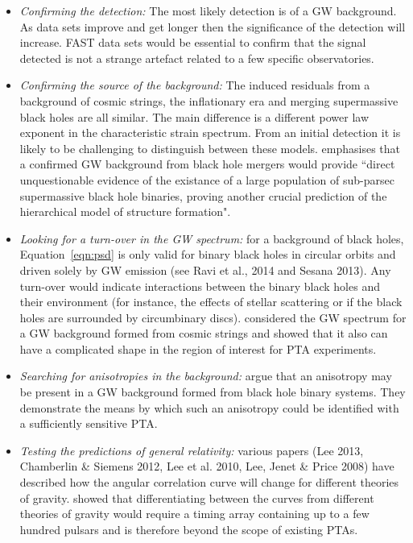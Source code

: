 \documentclass{raa}            %
\begin{document}
\begin{itemize}
\item \emph{Confirming the detection:}  The most likely detection is of a GW background.  As data sets improve and get longer then the significance of the detection will increase.  FAST data sets would be essential to confirm that the signal detected is not a strange artefact related to a few specific observatories.
\item \emph{Confirming the source of the background:} The induced residuals from a background of cosmic strings, the inflationary era and merging supermassive black holes are all similar. The main difference is a different power law exponent in the characteristic strain spectrum.  From an initial detection it is likely to be challenging to distinguish between these models.  \cite{ses13} emphasises that a confirmed GW background from black hole mergers would provide ``direct unquestionable evidence of the existance of a large population of sub-parsec supermassive black hole binaries, proving another crucial prediction of the hierarchical model of structure formation".
\item \emph{Looking for a turn-over in the GW spectrum:} for a background of black holes, Equation~\ref{eqn:psd} is only valid for binary black holes in circular orbits and driven solely by GW emission (see Ravi et al., 2014\nocite{rws+14} and Sesana 2013\nocite{ses13}).   Any turn-over would indicate interactions between the binary black holes and their environment (for instance, the effects of stellar scattering or if the black holes are surrounded by circumbinary discs). \cite{sbs13} considered the GW spectrum for a GW background formed from cosmic strings and showed that it  also can have a complicated shape in the region of interest for PTA experiments.
\item \emph{Searching for anisotropies in the background:} \cite{msmv13} argue that an anisotropy may be present in a GW background formed from black hole binary systems.  They demonstrate the means by which such an anisotropy could be identified with a sufficiently sensitive PTA.
\item \emph{Testing the predictions of general relativity:} various papers (Lee 2013\nocite{lee13}, Chamberlin \& Siemens 2012\nocite{cs12}, Lee et al. 2010\nocite{ljp+10},  Lee, Jenet \& Price 2008\nocite{ljp08}) have described how the angular correlation curve will change for different theories of gravity. \cite{ljp08} showed that differentiating between the curves from different theories of gravity would require a timing array containing up to a few hundred pulsars and is therefore beyond the scope of existing PTAs.
\end{itemize}
\end{document}
